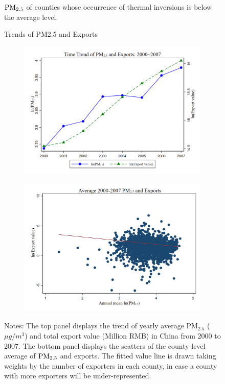 \documentclass[12pt]{article}
\begin{document}
\begin{figure}[H]
{    $\rm PM_{2.5}$ of counties whose occurrence of thermal inversions is below the average level.}
  \end{figure}

  \newpage
  \centering
  \begin{figure}[H]
    \centering
     \caption{Trends of PM2.5 and Exports}\label{fig:4}
      \begin{subfigure}[b]{.75\textwidth}
       \centering
        \includegraphics[width=\linewidth]{images_updated/exp_pm25_trend}
        \caption{}\label{fig:fig_4a}
        \end{subfigure}
         \begin{subfigure}[b]{.75\textwidth}
         \centering
         \includegraphics[width=\linewidth]{images_updated/exp_pm25}
          \caption{}\label{fig:fig_4b}
          \end{subfigure}
    \small
    \caption*{Notes: The top panel displays the trend of yearly average $\mathrm{PM_{2.5}}$ ($\mu g/m^3$) and total export value (Million RMB) in China from 2000 to 2007. The bottom panel displays the scatters of the county-level average of $\rm PM_{2.5}$ and exports. The  fitted value line is drawn taking weights by the number of exporters in each county, in case a county with more exporters will be under-represented.}
  \end{figure}
  \let\clearpage\relax
\end{document}

